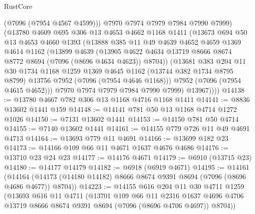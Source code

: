 \begin{lexlean}{RustCore}
\begin{coremodule}
              (@7096 (@7954 @4567 @4599)))
            @7970
            @7974
            @7979
            @7984
            @7990
            @7999)
          (@13780
            @4609
            @695
            @306
            @13
            @4653
            @4662
            @1168
            @1411
            (@13673
              @694
              @50
              @13
              @4653
              @4660
              @1393
              (@13888
                @385
                @11
                @49
                @4639
                @4652
                @4659
                @1369
                @4614
                @1162
                (@13899
                  @4639
                  (@13905
                    @4622
                    @4634
                    @13719
                    @8666
                    @8674
                    @8772
                    @8694
                    (@7096 (@8696 @4634 @4623))
                    @8704))
                (@13681
                  @383
                  @204
                  @11
                  @30
                  @1734
                  @1168
                  @1259
                  @1369
                  @4645
                  @1162
                  (@13744 @382 @1734 @8795 @8799)
                  @13756
                  @7952
                  (@7096 (@7954 @4646 @1168)))
                @7952
                (@7096 (@7954 @4615 @4652)))
              @7970
              @7974
              @7979
              @7984
              @7990
              @7999)
            @13967))))
@14138 := @13780 @4667 @782 @306 @13 @1168 @4716 @1168 @1411
@14141 := @8836 @13602 @1441 @159
@14148 := @14141 @781 @50 @13 @1168 @4714 @1272 @1026
@14150 := @7131 @13602 @1441
@14153 := @14150 @781 @50 @4714
@14155 := @7140 @13602 @1441
@14161 := @14155 @779 @726 @11 @49 @4691 @4713
@14164 := @13693 @779 @11 @4691
@14166 := @13699 @182 @23
@14173 := @14166 @109 @66 @11 @4671 @1637 @4676 @4686
@14176 := @13710 @23 @24 @23
@14177 := @14176 @4671
@14179 := @6910 (@13715 @23)
@14180 := @14177 @14179
@14182 := @6918 (@6919 @4671)
@14195 := @14161
    (@14164 (@14173 (@14180 @14182) @8666 @8674 @9391 @8694 (@7096 (@8696 @4686 @4677)) @8704))
@14223 := @14155
    @616
    @204
    @11
    @30
    @4711
    @1259
    (@13693
      @616
      @11
      @4711
      (@13701
        @109
        @66
        @11
        @2316
        @1637
        @4696
        @4706
        @13719
        @8666
        @8674
        @9391
        @8694
        (@7096 (@8696 @4706 @4697))
        @8704))

\end{coremodule}
\end{lexlean}
